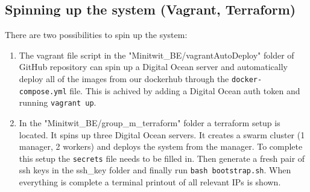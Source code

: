 \subsection{Spinning up the system (Vagrant, Terraform)}

There are two possibilities to spin up the system:

\begin{enumerate}
  \item The vagrant file script in the "Minitwit\_BE/vagrantAutoDeploy" folder of GitHub repository can spin up a Digital Ocean server and automatically deploy all of the images from our dockerhub through the \texttt{docker-compose.yml} file. This is achived by adding a Digital Ocean auth token and running \texttt{vagrant up}.
  \item In the "Minitwit\_BE/group\_m\_terraform" folder a terraform setup is located. It spins up three Digital Ocean servers. It creates a swarm cluster (1 manager, 2 workers) and deploys the system from the manager. To complete this setup the \texttt{secrets} file needs to be filled in. Then generate a fresh pair of ssh keys in the ssh\_key folder and finally run \texttt{bash bootstrap.sh}. When everything is complete a terminal printout of all relevant IPs is shown.
\end{enumerate}

